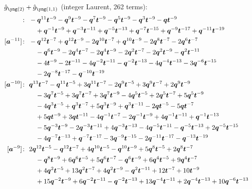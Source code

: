 $\hat g_{\ytwo} + \hat g_{\yoneone}$ (integer Laurent, 262 terms):
\begin{align*}
[\ba^{-12}]\colon\ & -\bq^{11} \bt^{-9} -\bq^{9} \bt^{-9} -\bq^{7} \bt^{-9} -\bq^{5} \bt^{-9} -\bq^{3} \bt^{-9} -\bq \bt^{-9} \\
& \quad +\bq^{-1} \bt^{-9} +\bq^{-3} \bt^{-11} +\bq^{-5} \bt^{-13} +\bq^{-7} \bt^{-15} +\bq^{-9} \bt^{-17} +\bq^{-11} \bt^{-19} \\
[\ba^{-11}]\colon\ & -\bq^{12} \bt^{-7} +\bq^{12} \bt^{-9} -2 \bq^{10} \bt^{-7} +\bq^{10} \bt^{-9} -2 \bq^{8} \bt^{-7} -2 \bq^{6} \bt^{-7} \\
& \quad -\bq^{6} \bt^{-9} -2 \bq^{4} \bt^{-7} -2 \bq^{4} \bt^{-9} -2 \bq^{2} \bt^{-7} -2 \bq^{2} \bt^{-9} -\bq^{2} \bt^{-11} \\
& \quad -4 \bt^{-9} -2 \bt^{-11} -4 \bq^{-2} \bt^{-11} -\bq^{-2} \bt^{-13} -4 \bq^{-4} \bt^{-13} -3 \bq^{-6} \bt^{-15} \\
& \quad -2 \bq^{-8} \bt^{-17} -\bq^{-10} \bt^{-19} \\
[\ba^{-10}]\colon\ & \bq^{13} \bt^{-7} -\bq^{11} \bt^{-5} +3 \bq^{11} \bt^{-7} -2 \bq^{9} \bt^{-5} +3 \bq^{9} \bt^{-7} +2 \bq^{9} \bt^{-9} \\
& \quad -3 \bq^{7} \bt^{-5} +3 \bq^{7} \bt^{-7} +3 \bq^{7} \bt^{-9} -4 \bq^{5} \bt^{-5} +2 \bq^{5} \bt^{-7} +5 \bq^{5} \bt^{-9} \\
& \quad -4 \bq^{3} \bt^{-5} +\bq^{3} \bt^{-7} +5 \bq^{3} \bt^{-9} +\bq^{3} \bt^{-11} -2 \bq \bt^{-5} -5 \bq \bt^{-7} \\
& \quad +5 \bq \bt^{-9} +3 \bq \bt^{-11} -4 \bq^{-1} \bt^{-7} -2 \bq^{-1} \bt^{-9} +4 \bq^{-1} \bt^{-11} +\bq^{-1} \bt^{-13} \\
& \quad -5 \bq^{-3} \bt^{-9} -2 \bq^{-3} \bt^{-11} +4 \bq^{-3} \bt^{-13} -4 \bq^{-5} \bt^{-11} -\bq^{-5} \bt^{-13} +2 \bq^{-5} \bt^{-15} \\
& \quad -4 \bq^{-7} \bt^{-13} +\bq^{-7} \bt^{-17} -3 \bq^{-9} \bt^{-15} -2 \bq^{-11} \bt^{-17} -\bq^{-13} \bt^{-19} \\
[\ba^{-9}]\colon\ & 2 \bq^{12} \bt^{-5} -\bq^{12} \bt^{-7} +4 \bq^{10} \bt^{-5} -\bq^{10} \bt^{-9} +5 \bq^{8} \bt^{-5} +2 \bq^{8} \bt^{-7} \\
& \quad -\bq^{8} \bt^{-9} +6 \bq^{6} \bt^{-5} +5 \bq^{6} \bt^{-7} -\bq^{6} \bt^{-9} +6 \bq^{4} \bt^{-5} +9 \bq^{4} \bt^{-7} \\
& \quad +4 \bq^{2} \bt^{-5} +13 \bq^{2} \bt^{-7} +4 \bq^{2} \bt^{-9} -\bq^{2} \bt^{-11} +12 \bt^{-7} +10 \bt^{-9} \\
& \quad +15 \bq^{-2} \bt^{-9} +6 \bq^{-2} \bt^{-11} -\bq^{-2} \bt^{-13} +13 \bq^{-4} \bt^{-11} +2 \bq^{-4} \bt^{-13} +10 \bq^{-6} \bt^{-13} \\

\end{align*}
